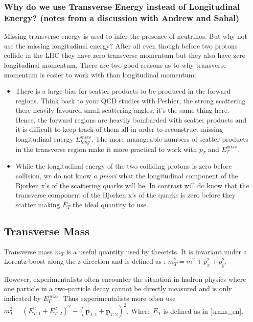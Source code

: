 \documentclass{article}
\begin{document}
\subsubsection{Why do we use Transverse Energy instead of Longitudinal Energy? (notes from a discussion with Andrew and Sahal)}
Missing transverse energy is used to infer the presence of neutrinos. But why not use the missing longitudinal energy? After all even though before two protons collide in the LHC they have zero transverse momentum but they also have zero longitudinal momentum. There are two good reasons as to why transverse momentum is easier to work with than longitudinal momentum:
\begin{itemize}
\item There is a large bias for scatter products to be produced in the forward regions. Think back to your QCD studies with Peshier, the strong scattering there heavily favoured small scattering angles; it's the same thing here. Hence, the forward regions are heavily bombarded with scatter products and it is difficult to keep track of them all in order to reconstruct missing longitudinal energy $E_{long}^{miss}$. The more manageable numbers of scatter products in the transverse region make it more practical to work with $p_{T}$ and $E_{T}^{miss}$.
\item While the longitudinal energy of the two colliding protons is zero before collision, we do not know \emph{a priori} what the longitudinal component of the Bjorken x's of the scattering quarks will be. In contrast will do know that the transverse component of the Bjorken x's of the quarks is zero before they scatter making $E_{T}$ the ideal quantity to use.
\end{itemize}

\subsection{Transverse Mass}
Transverse mass $m_{T}$ is a useful quantity used by theorists. It is invariant under a Lorentz boost along the z-direction and is defined as : $m_{T}^{2} = m^{2} + p_{x}^{2} + p_{y}^{2}$.

However, experimentalists often encounter the situation in hadron physics where one particle in a two-particle decay cannot be directly measured and is only indicated by $E_{T}^{miss}$. Thus experimentalists more often use $m_{T}^{2} = \left( E_{T,1}^{2} + E_{T,2}^{2}\right)^{2} - \left(\textbf{p}_{T,1} + \textbf{p}_{T,2}\right)^{2}$. Where $E_{T}$ is defined as in \ref{trans_en}.
\end{document}
